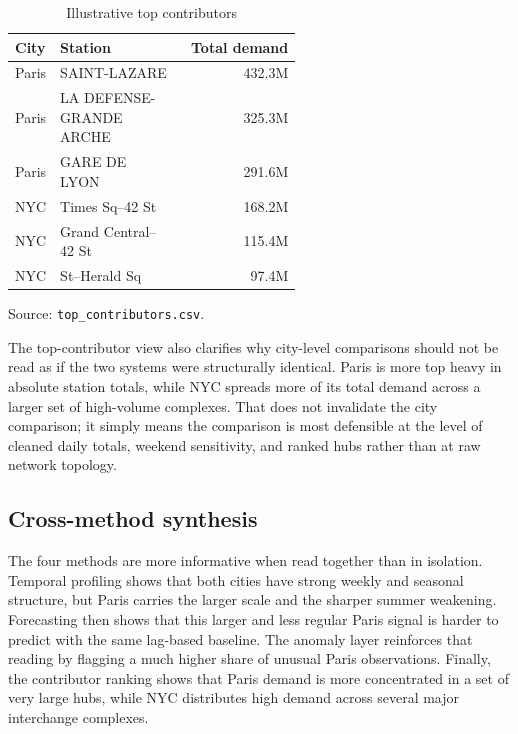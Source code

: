 \documentclass[10pt,twocolumn,a4paper]{article}
\begin{document}
\begin{table}[t]
\centering
\footnotesize
\caption{Illustrative top contributors}
\begin{tabular}{>{\raggedright\arraybackslash}p{0.14\linewidth}>{\raggedright\arraybackslash}p{0.43\linewidth}r}
\toprule
City & Station & Total demand \\
\midrule
Paris & SAINT-LAZARE & 432.3M \\
Paris & LA DEFENSE-GRANDE ARCHE & 325.3M \\
Paris & GARE DE LYON & 291.6M \\
NYC & Times Sq--42 St & 168.2M \\
NYC & Grand Central--42 St & 115.4M \\
NYC & 34 St--Herald Sq & 97.4M \\
\bottomrule
\end{tabular}

\par\vspace{2pt}\raggedright\footnotesize
Source: \nolinkurl{top_contributors.csv}.
\end{table}

The top-contributor view also clarifies why city-level comparisons should not
be read as if the two systems were structurally identical. Paris is more top
heavy in absolute station totals, while NYC spreads more of its total demand
across a larger set of high-volume complexes. That does not invalidate the city
comparison; it simply means the comparison is most defensible at the level of
cleaned daily totals, weekend sensitivity, and ranked hubs rather than at raw
network topology.

\subsection{Cross-method synthesis}

The four methods are more informative when read together than in isolation.
Temporal profiling shows that both cities have strong weekly and seasonal
structure, but Paris carries the larger scale and the sharper summer weakening.
Forecasting then shows that this larger and less regular Paris signal is harder
to predict with the same lag-based baseline. The anomaly layer reinforces that
reading by flagging a much higher share of unusual Paris observations. Finally,
the contributor ranking shows that Paris demand is more concentrated in a set of
very large hubs, while NYC distributes high demand across several major
interchange complexes.
\end{document}

